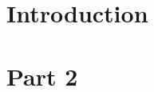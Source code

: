 \documentclass{article}
\begin{document}
\section{Introduction}


\section{Part 2}



\end{document}
